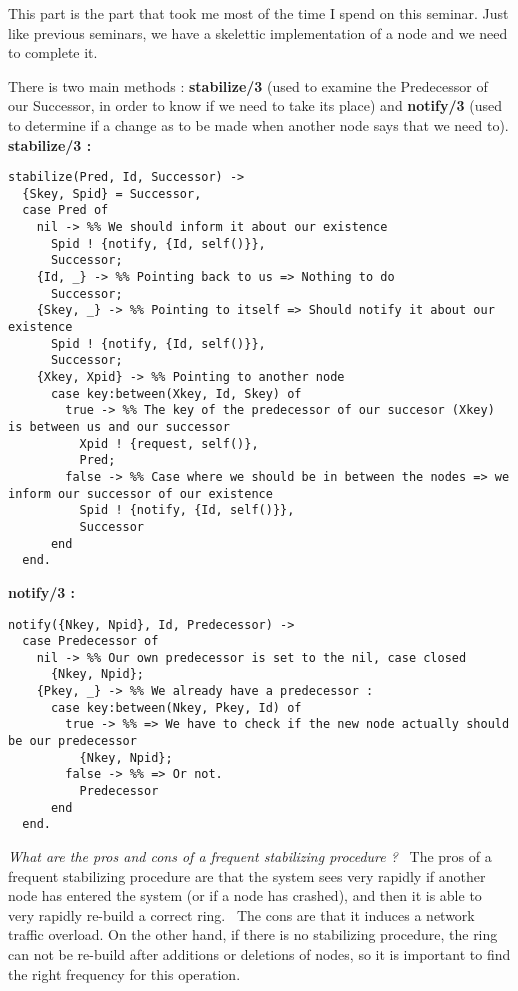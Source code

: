 \documentclass[a4paper, 11pt]{article}
\begin{document}
This part is the part that took me most of the time I spend on this seminar. Just like previous seminars, we have a skelettic implementation of a node and we need to complete it. \

There is two main methods : \textbf{stabilize/3} (used to examine the Predecessor of our Successor, in order to know if we need to take its place) and \textbf{notify/3} (used to determine if a change as to be made when another node says that we need to). \\

\textbf{stabilize/3 :}

\begin{verbatim}
stabilize(Pred, Id, Successor) ->
  {Skey, Spid} = Successor,
  case Pred of
    nil -> %% We should inform it about our existence
      Spid ! {notify, {Id, self()}},
      Successor;
    {Id, _} -> %% Pointing back to us => Nothing to do
      Successor;
    {Skey, _} -> %% Pointing to itself => Should notify it about our existence
      Spid ! {notify, {Id, self()}},
      Successor;
    {Xkey, Xpid} -> %% Pointing to another node
      case key:between(Xkey, Id, Skey) of
        true -> %% The key of the predecessor of our succesor (Xkey) is between us and our successor 
          Xpid ! {request, self()},
          Pred;
        false -> %% Case where we should be in between the nodes => we inform our successor of our existence
          Spid ! {notify, {Id, self()}},
          Successor
      end
  end.
\end{verbatim}


\textbf{notify/3 : }

\begin{verbatim}
notify({Nkey, Npid}, Id, Predecessor) ->
  case Predecessor of
    nil -> %% Our own predecessor is set to the nil, case closed
      {Nkey, Npid};
    {Pkey, _} -> %% We already have a predecessor :
      case key:between(Nkey, Pkey, Id) of
        true -> %% => We have to check if the new node actually should be our predecessor
          {Nkey, Npid};
        false -> %% => Or not.
          Predecessor
      end
  end.
\end{verbatim}
 
\textit{What are the pros and cons of a frequent stabilizing procedure ?} \
The pros of a frequent stabilizing procedure are that the system sees very rapidly if another node has entered the system (or if a node has crashed), and then it is able to very rapidly re-build a correct ring. \
The cons are that it induces a network traffic overload. On the other hand, if there is no stabilizing procedure, the ring can not be re-build after additions or deletions of nodes, so it is important to find the right frequency for this operation.
\end{document}
